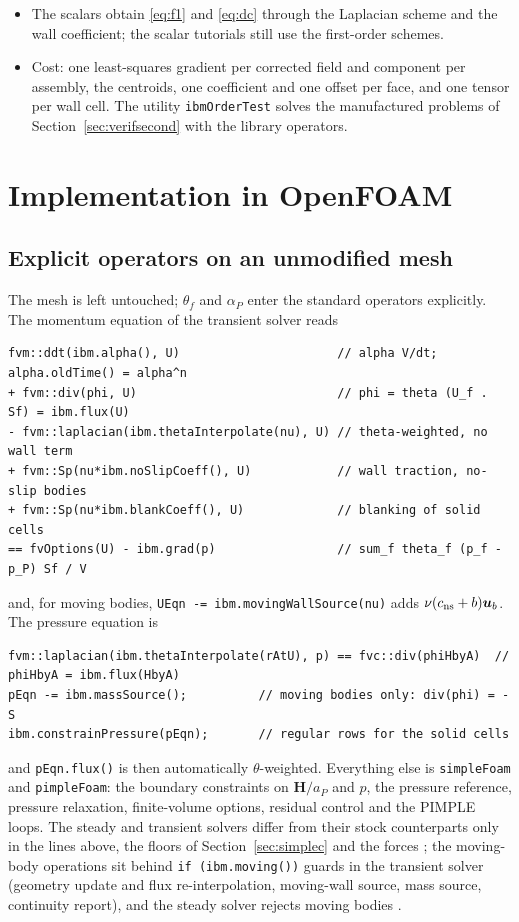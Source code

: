 \documentclass[11pt,a4paper]{article}
\theoremstyle{remark}
\newcommand{\uu}{\bm{u}}
\newcommand{\ub}{\uu_b}
\newcommand{\cns}{c_{\rm ns}}
\newcommand{\code}[1]{\texttt{#1}}
\begin{document}
\begin{itemize}
      geometry at every step. The combination has been exercised only with a body rotating in
      place (Section~\ref{sec:tc}).
\item The scalars obtain \eqref{eq:f1} and \eqref{eq:dc} through the Laplacian scheme and the
      wall coefficient; the scalar tutorials still use the first-order schemes.
\item Cost: one least-squares gradient per corrected field and component per assembly, the
      centroids, one coefficient and one offset per face, and one tensor per wall cell. The utility \code{ibmOrderTest} solves the
      manufactured problems of Section~\ref{sec:verifsecond} with the library operators.
\end{itemize}
\section{Implementation in OpenFOAM}
\label{sec:impl}

\subsection{Explicit operators on an unmodified mesh}

The mesh is left untouched; $\theta_f$ and $\alpha_P$ enter the standard operators
explicitly. The momentum equation of the transient solver reads
\begin{lstlisting}
fvm::ddt(ibm.alpha(), U)                      // alpha V/dt; alpha.oldTime() = alpha^n
+ fvm::div(phi, U)                            // phi = theta (U_f . Sf) = ibm.flux(U)
- fvm::laplacian(ibm.thetaInterpolate(nu), U) // theta-weighted, no wall term
+ fvm::Sp(nu*ibm.noSlipCoeff(), U)            // wall traction, no-slip bodies
+ fvm::Sp(nu*ibm.blankCoeff(), U)             // blanking of solid cells
== fvOptions(U) - ibm.grad(p)                 // sum_f theta_f (p_f - p_P) Sf / V
\end{lstlisting}
and, for moving bodies, \code{UEqn -= ibm.movingWallSource(nu)} adds
$\nu(\cns+b)\ub$.
The pressure equation is
\begin{lstlisting}
fvm::laplacian(ibm.thetaInterpolate(rAtU), p) == fvc::div(phiHbyA)  // phiHbyA = ibm.flux(HbyA)
pEqn -= ibm.massSource();          // moving bodies only: div(phi) = -S
ibm.constrainPressure(pEqn);       // regular rows for the solid cells
\end{lstlisting}
and \code{pEqn.flux()} is then automatically $\theta$-weighted. Everything else is
\code{simpleFoam} and \code{pimpleFoam}: the boundary constraints on $\bm H/a_P$ and $p$, the
pressure reference, pressure relaxation, finite-volume options, residual control and the
PIMPLE loops. The steady and transient solvers differ from their stock counterparts only in
the lines above, the floors of Section~\ref{sec:simplec} and the forces%
; the moving-body operations sit behind \code{if (ibm.moving())} guards in the
transient solver (geometry update and flux re-interpolation, moving-wall source,
mass source, continuity report), and the steady solver rejects moving bodies%
.
\end{document}
